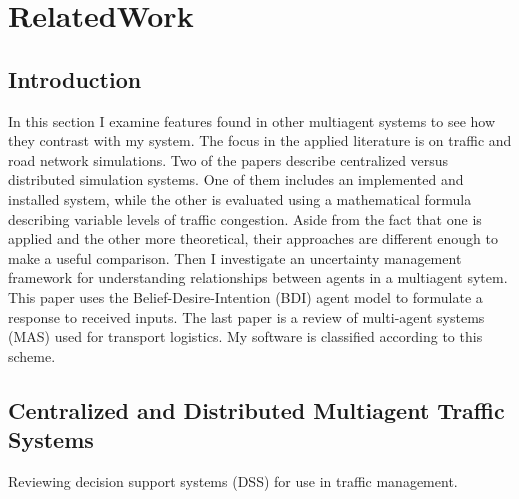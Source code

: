 \documentclass[11pt,letterpaper,onecolumn,twoside,openright,draft]{report}
\begin{document}
\cite{davidsson2005aab}
\cite{yokoo1999}

%


\chapter{RelatedWork}
\section{Introduction}
In this section I examine features found in other multiagent systems to see how they contrast with my system.
The focus in the applied literature is on traffic and road network simulations.
Two of the papers describe centralized versus distributed simulation systems\cite{france2003mso,hernandez2001}.
One of them includes an implemented and installed system, while the other is evaluated using a mathematical formula describing variable levels of traffic congestion.
Aside from the fact that one is applied and the other more theoretical, their approaches are different enough to make a useful comparison.
Then I investigate an uncertainty management framework for understanding relationships between agents in a multiagent sytem\cite{wu2003umf}.
This paper uses the Belief-Desire-Intention (BDI) agent model to formulate a response to received inputs.
The last paper is a review of multi-agent systems (MAS) used for transport logistics\cite{davidsson2005aab}.
My software is classified according to this scheme.

\section{Centralized and Distributed Multiagent Traffic Systems}
Reviewing decision support systems (DSS) for use in traffic management.
\end{document}
